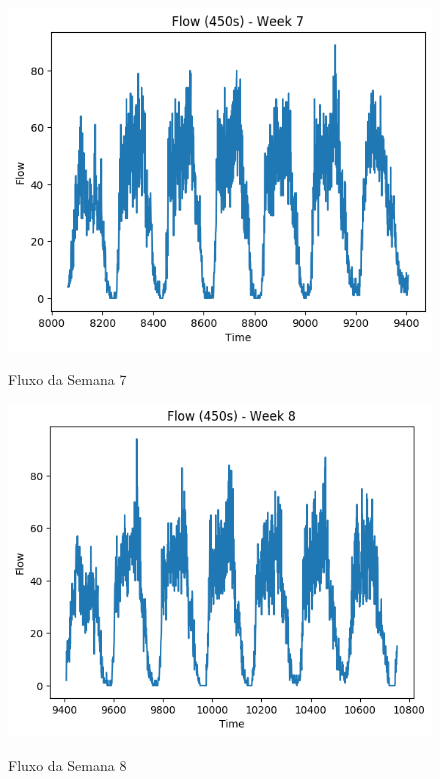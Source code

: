 \begin{figure}[h]
    \centering
    \includegraphics[scale=0.9]{monography/img/flows/flow_450_week_07.png}
    \label{figure:flow_450_week_07}
    \caption{Fluxo da Semana 7}
\end{figure}


\begin{figure}[h]
    \centering
    \includegraphics[scale=0.9]{monography/img/flows/flow_450_week_08.png}
    \label{figure:flow_450_week_08}
    \caption{Fluxo da Semana 8}
\end{figure}


